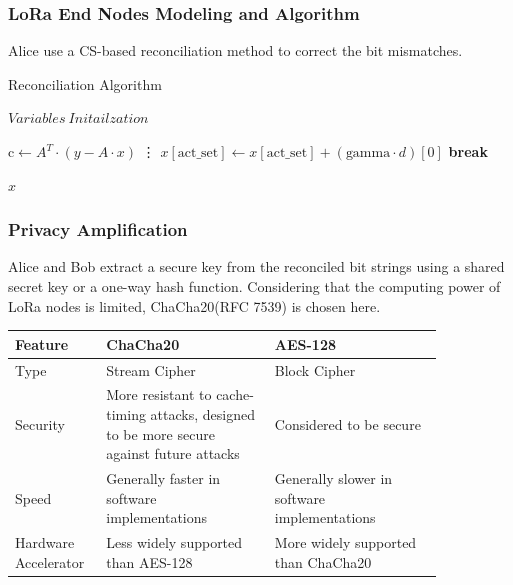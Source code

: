 \documentclass{beamer}
\begin{document}
\begin{frame}
  \frametitle{LoRa End Nodes Modeling and Algorithm}
  Alice use a CS-based reconciliation method to correct the bit mismatches.
  \begin{algorithm}[H]
    \caption{Reconciliation Algorithm}\label{alg:Reconciliation}
    \begin{algorithmic}
        \State $Variables\ Initailzation$
    
            \State $\text{c} \gets A^T \cdot (y - A \cdot x)$
            \State \vdots {}
            \State $x[\text{act\_set}] \gets x[\text{act\_set}] + (\text{gamma} \cdot d)[0]$
              \State \textbf{break}
          \EndIf
        \EndFor
    
        \State \Return $x$
    \EndFunction
    \end{algorithmic}
    \end{algorithm}
\end{frame}

\begin{frame}
  \frametitle{Privacy Amplification}
  Alice and Bob extract a secure key from the reconciled bit strings using a shared secret key or a one-way hash function. Considering that the computing power of LoRa nodes is limited, ChaCha20(RFC 7539)\cite{rfc7539} is chosen here.
  \begin{tabular}{p{0.15\linewidth}p{0.35\linewidth}p{0.35\linewidth}}
    \hline
    Feature&ChaCha20&AES-128\\
    \hline
    Type&Stream Cipher&Block Cipher\\
    \hline
    Security&More resistant to cache-timing attacks, designed to be more secure against future attacks&Considered to be secure\\
    \hline
    Speed&Generally faster in software implementations&Generally slower in software implementations\\
    \hline
    Hardware Accelerator&Less widely supported than AES-128&More widely supported than ChaCha20    \\
    \hline
    \end{tabular}
\end{frame}
\end{document}
